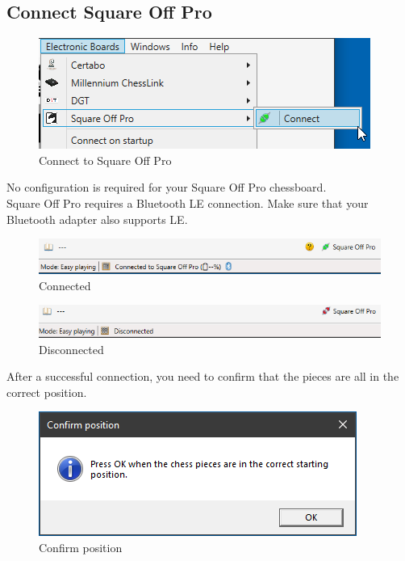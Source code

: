 \documentclass[11pt,a4paper]{article}
\begin{document}
\subsection{Connect Square Off Pro} \label{ConfigureSquareOff}
\begin{figure}[H]
	\centering
	\includegraphics[scale=1.0]{SquareOffPro1.png}
	\caption{Connect to Square Off Pro }
	\label{fig:SquareOffPro1}
\end{figure}

No configuration is required for your Square Off Pro chessboard.\\
Square Off Pro requires a Bluetooth LE connection. Make sure that your Bluetooth adapter also supports LE.

\begin{figure}[H]
	\centering
	\includegraphics[scale=0.8]{SquareOffPro2.png}
	\caption{Connected}
	\label{fig:SquareOffPro2}
\end{figure}

\begin{figure}[H]
	\centering
	\includegraphics[scale=0.8]{SquareOffPro3.png}
	\caption{Disconnected}
	\label{fig:SquareOffPro3}
\end{figure}

After a successful connection, you need to confirm that the pieces are all in the correct position.

\begin{figure}[H]
	\centering
	\includegraphics[scale=0.8]{Pegasus4.png}
	\caption{Confirm position}
	\label{fig:SquareOffPro4}
\end{figure}
\end{document}
